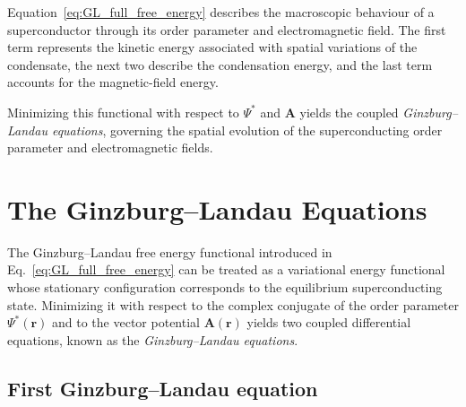 Equation~\eqref{eq:GL_full_free_energy} describes the macroscopic behaviour of a superconductor through its order parameter and electromagnetic field.  
The first term represents the kinetic energy associated with spatial variations of the condensate, the next two describe the condensation energy, and the last term accounts for the magnetic-field energy.

Minimizing this functional with respect to $\Psi^*$ and $\mathbf{A}$ yields the coupled \emph{Ginzburg--Landau equations}, governing the spatial evolution of the superconducting order parameter and electromagnetic fields.

\section{The Ginzburg--Landau Equations}
\label{sec:GL_equations}

The Ginzburg--Landau free energy functional introduced in Eq.~\eqref{eq:GL_full_free_energy}
can be treated as a variational energy functional whose stationary configuration corresponds
to the equilibrium superconducting state.  
Minimizing it with respect to the complex conjugate of the order parameter $\Psi^*(\mathbf{r})$
and to the vector potential $\mathbf{A}(\mathbf{r})$ yields two coupled differential equations,
known as the \textit{Ginzburg--Landau equations}.

\subsection*{First Ginzburg--Landau equation}

